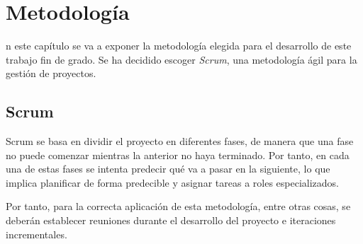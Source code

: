 \chapter{Metodología}
\label{chap:metodologia}

n este capítulo se va a exponer la metodología elegida para el desarrollo de este trabajo fin de grado. Se ha decidido escoger \textit{Scrum}, una metodología ágil para la gestión de proyectos.

\section{Scrum}
Scrum se basa en dividir el proyecto en diferentes fases, de manera que una fase no puede comenzar mientras la anterior no haya terminado. Por tanto, en cada una de estas fases se intenta predecir qué va a pasar en la siguiente, lo que implica planificar de forma predecible y asignar tareas a roles especializados.

Por tanto, para la correcta aplicación de esta metodología, entre otras cosas, se deberán establecer reuniones durante el desarrollo del proyecto e iteraciones incrementales.